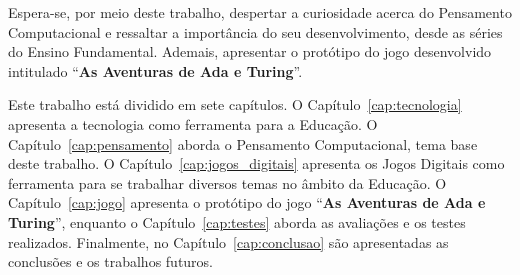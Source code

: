 Espera-se, por meio deste trabalho, despertar a curiosidade acerca do Pensamento Computacional e ressaltar a importância do seu desenvolvimento, desde as séries do Ensino Fundamental. Ademais, apresentar o protótipo do jogo desenvolvido intitulado “\textbf{As Aventuras de Ada e Turing}”.

Este trabalho está dividido em sete capítulos. O Capítulo~\ref{cap:tecnologia} apresenta a tecnologia como ferramenta para a Educação. O Capítulo~\ref{cap:pensamento} aborda o Pensamento Computacional, tema base deste trabalho. O Capítulo~\ref{cap:jogos_digitais} apresenta os Jogos Digitais como ferramenta para se trabalhar diversos temas no âmbito da Educação. O Capítulo~\ref{cap:jogo} apresenta o protótipo do jogo “\textbf{As Aventuras de Ada e Turing}”, enquanto o Capítulo~\ref{cap:testes} aborda as avaliações e os testes realizados. Finalmente, no Capítulo~\ref{cap:conclusao} são apresentadas as conclusões e os trabalhos futuros.